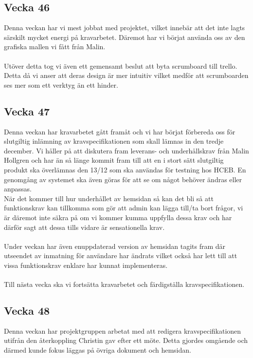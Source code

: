 \documentclass[12pt]{article}
\begin{document}
	\subsection{Vecka 46}
Denna veckan har vi mest jobbat med projektet, vilket innebär att det inte lagts särskilt mycket energi på kravarbetet. Däremot har vi börjat använda
oss av den grafiska mallen vi fått från Malin.
\\
\\
Utöver detta tog vi även ett gemensamt beslut att byta scrumboard till trello. Detta då vi anser att deras design är mer intuitiv vilket medför att
scrumboarden ses mer som ett verktyg än ett hinder.

\subsection{Vecka 47}
 Denna veckan har kravarbetet gått framåt och vi har börjat förbereda oss för slutgiltig inlämning av kravspecifikationen som skall lämnas in den tredje december. Vi håller på att diskutera fram leverans- och underhållskrav från Malin Hollgren och har än så länge kommit fram till att en i stort sätt slutgiltig produkt ska överlämnas den 13/12 som ska användas för testning hos HCEB. En genomgång av systemet ska även göras för att se om något behöver ändras eller anpassas.\\ När det kommer till hur underhållet av hemsidan så kan det bli så att funktionskrav kan tillkomma som gör att admin kan lägga till/ta bort frågor, vi är däremot inte säkra på om vi kommer kumma uppfylla dessa krav och har därför sagt att dessa tills vidare är sensationella krav. \\\\
 Under veckan har även enuppdaterad version av hemsidan tagits fram där utseendet av inmatning för användare har ändrats vilket också har lett till att vissa funktionskrav enklare har kunnat implementeras. \\\\
 Till nästa vecka ska vi fortsätta kravarbetet och färdigställa kravspecifikationen.
 \newpage
 \subsection{Vecka 48}
 Denna veckan har projektgruppen arbetat med att redigera kravspecifikationen utifrån den återkoppling Christin gav efter ett möte. Detta gjordes omgående och därmed kunde fokus läggas på övriga dokument och hemsidan. \\\\
 
\end{document}
